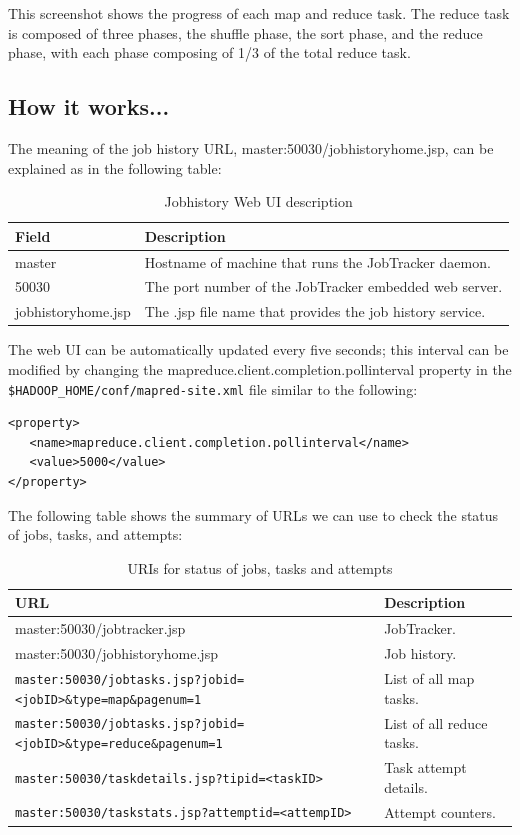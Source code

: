 This screenshot shows the progress of each map and reduce task. The reduce task is composed of three phases, the shuffle phase, the sort phase, and the reduce phase, with each phase composing of 1/3 of the total reduce task.

\subsection*{How it works...}
The meaning of the job history URL, master:50030/jobhistoryhome.jsp, can be explained as in the following table:

\begin{table}
  \centering
  \begin{tabular}{ll}
    \toprule 
    \textbf{Field} & \textbf{Description} \\  \midrule
    master & Hostname of machine that runs the JobTracker daemon. \\
    50030 & The port number of the JobTracker embedded web server. \\
    jobhistoryhome.jsp & The .jsp file name that provides the job history service. \\ \bottomrule
  \end{tabular}
  \caption{Jobhistory Web UI description}\label{tbl:jobhistory}
\end{table}

    The web UI can be automatically updated every five seconds; this interval can be modified by changing the mapreduce.client.completion.pollinterval property in the \verb|$HADOOP_HOME/conf/mapred-site.xml| file similar to the following:
\begin{verbatim}
<property>
   <name>mapreduce.client.completion.pollinterval</name>
   <value>5000</value>
</property>
\end{verbatim}

The following table shows the summary of URLs we can use to check the status of jobs, tasks, and attempts:
\begin{table}
  \footnotesize
  \centering
  \begin{tabular}{ll}
    \toprule 
    \textbf{URL} & \textbf{Description} \\ \midrule
    master:50030/jobtracker.jsp & JobTracker.\\
    master:50030/jobhistoryhome.jsp & Job history. \\
    \verb|master:50030/jobtasks.jsp?jobid=<jobID>&type=map&pagenum=1| & List of all map tasks. \\
    \verb|master:50030/jobtasks.jsp?jobid=<jobID>&type=reduce&pagenum=1| & List of all reduce tasks. \\
    \verb|master:50030/taskdetails.jsp?tipid=<taskID>| & Task attempt details. \\
    \verb|master:50030/taskstats.jsp?attemptid=<attempID>| & Attempt counters.\\ \bottomrule
  \end{tabular}
  \caption{URIs for status of jobs, tasks and attempts}\label{tbl:statusuris}
\end{table}


